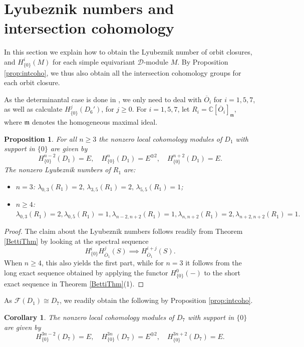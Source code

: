 \documentclass[11pt,reqno]{amsart}
\newcommand{\D}{\mathcal{D}}
\newcommand{\C}{\mathbb{C}}
\newcommand{\mc}[1]{\mathcal{#1}}
\newcommand{\ol}[1]{\overline{#1}}
\newtheorem{corollary}[theorem]{Corollary}
\newtheorem{prop}[theorem]{Proposition}
\numberwithin{equation}{section}
\begin{document}
\section{Lyubeznik numbers and intersection cohomology}\label{sec:lyub}

In this section we explain how to obtain the Lyubeznik number of orbit closures, and $H^i_{\{0\}}(M)$ for each simple equivariant $\D$-module $M$. By Proposition \ref{prop:intcoho}, we thus also obtain all the intersection cohomology groups for each orbit closure.


As the determinantal case is done in \cite{lorcla}, we only need to deal with $\ol{O}_i$ for $i=1,5,7$, as well as calculate $H^j_{\{0\}}(D_6')$, for $j\geq 0$. For $i=1,5,7$, let $R_i=\C[\ol{O}_i]_{\mathfrak{m}}$, where $\mathfrak{m}$ denotes the homogeneous maximal ideal.

\begin{prop}\label{prop:loc0D1}
For all $n\geq 3$ the nonzero local cohomology modules of $D_1$ with support in $\{0\}$ are given by	
$$
H^{n-2}_{\{0\}}(D_1)=E,\quad H^{n}_{\{0\}}(D_1)=E^{\oplus 2},\quad H^{n+2}_{\{0\}}(D_1)=E.
$$
The nonzero Lyubeznik numbers of $R_1$ are:
\begin{itemize}
\item[(a)] $n=3$: $\lambda_{0,3}(R_1)= 2, \, \lambda_{3,5}(R_1)=2, \, \lambda_{5,5}(R_1)=1$; 
\item[(b)] $n\geq 4$: $\lambda_{0,3}(R_1) =2 , \lambda_{0,5}(R_1) = 1, \lambda_{n-2,n+2}(R_1)=1, \lambda_{n,n+2}(R_1)=2, \lambda_{n+2,n+2}(R_1)=1.$
\end{itemize}
\end{prop}

\begin{proof}
The claim about the Lyubeznik numbers follows readily from Theorem \ref{BettiThm} by looking at the spectral sequence 
\[H^i_{\{0\}} H^j_{\ol{O}_1} (S) \implies H^{i+j}_{\ol{O}_1}(S).\]
When $n\geq 4$, this also yields the first part, while for $n=3$ it follows from the long exact sequence obtained by applying the functor $H_{\{0\}}^0(-)$ to the short exact sequence in Theorem \ref{BettiThm}(1).
\end{proof}


As $\mc{F}(D_1)\cong D_7$, we readily obtain the following by Proposition \ref{prop:intcoho}.

\begin{corollary}\label{cor:loc0D7}
The nonzero local cohomology modules of $D_7$ with support in $\{0\}$ are given by	
$$
H^{3n-2}_{\{0\}}(D_7)=E,\quad H^{3n}_{\{0\}}(D_7)=E^{\oplus 2},\quad H^{3n+2}_{\{0\}}(D_7)=E.
$$
\end{corollary}
\end{document}
